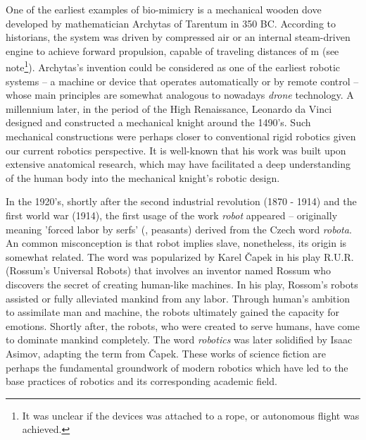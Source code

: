 One of the earliest examples of bio-mimicry is a mechanical wooden dove developed by mathematician Archytas of Tarentum in 350 BC. According to historians, the system was driven by compressed air or an internal steam-driven engine to achieve forward propulsion, capable of traveling distances of  \si{\meter} (see note\footnote{It was unclear if the devices was attached to a rope, or autonomous flight was achieved.}). Archytas's invention could be considered as one of the earliest robotic systems -- a machine or device that operates automatically or by remote control -- whose main principles are somewhat analogous to nowadays \emph{drone} technology.  A millennium later, in the period of the High Renaissance, Leonardo da Vinci designed and constructed a mechanical knight around the 1490's. Such mechanical constructions were perhaps closer to conventional rigid robotics given our current robotics perspective. It is well-known that his work was built upon extensive anatomical research, which may have facilitated a deep understanding of the human body into the mechanical knight's robotic design.

\par In the 1920's, shortly after the second industrial revolution (1870 - 1914) and the first world war (1914), the first usage of the work \emph{robot} appeared -- originally meaning 'forced labor by serfs' (\ie, peasants) derived from the Czech word \emph{robota}. An common misconception is that robot implies slave, nonetheless, its origin is somewhat related. The word was popularized by Karel \v{C}apek in his play R.U.R. (Rossum’s Universal Robots) that involves an inventor named Rossum who discovers the secret of creating human-like machines. In his play, Rossom's robots assisted or fully alleviated mankind from any labor. Through human's ambition to assimilate man and machine, the robots ultimately gained the capacity for emotions. Shortly after, the robots, who were created to serve humans, have come to dominate mankind completely. The word \emph{robotics} was later solidified by Isaac Asimov, adapting the term from \v{C}apek. These works of science fiction are perhaps the fundamental groundwork of modern robotics which have led to the base practices of robotics and its corresponding academic field.

